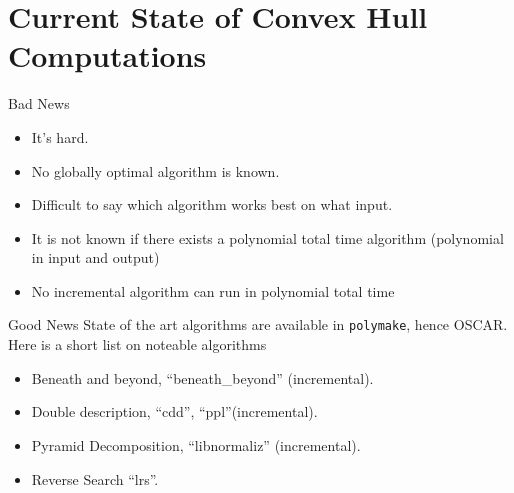 \documentclass[9pt]{beamer}
\theoremstyle{definition}
\begin{document}



\section{Current State of Convex Hull Computations}

\begin{frame}[fragile]{Bad News}
  \begin{itemize}
  \item It's hard.
  \item No globally optimal algorithm is known.
  \item Difficult to say which algorithm works best on what input.
  \item It is not known if there exists a polynomial total time algorithm (polynomial in input and output)
  \item No incremental algorithm can run in polynomial total time
  \end{itemize}
\end{frame}




\begin{frame}[fragile]{Good News}
  State of the art algorithms are available in \texttt{polymake}, hence OSCAR.
  Here is a short list on noteable algorithms 
  \begin{itemize}
  \item Beneath and beyond, ``beneath\_beyond'' (incremental).
  \item Double description, ``cdd'', ``ppl''(incremental).
  \item Pyramid Decomposition, ``libnormaliz'' (incremental).
  \item Reverse Search ``lrs''.
      
  \end{itemize}
\end{frame}
\end{document}
